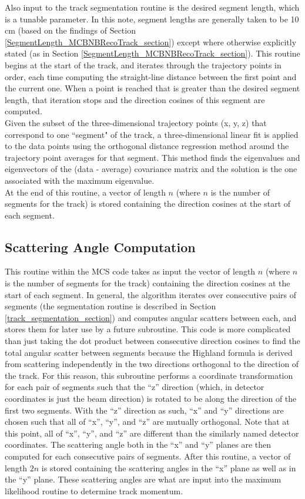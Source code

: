 Also input to the track segmentation routine is the desired segment length, which is a tunable parameter. In this note, segment lengths are generally taken to be 10 cm (based on the findings of Section \ref{SegmentLength_MCBNBRecoTrack_section}) except where otherwise explicitly stated (as in Section \ref{SegmentLength_MCBNBRecoTrack_section}). This routine begins at the start of the track, and iterates through the trajectory points in order, each time computing the straight-line distance between the first point and the current one. When a point is reached that is greater than the desired segment length, that iteration stops and the direction cosines of this segment are computed.\\

Given the subset of the three-dimensional trajectory points (x, y, z) that correspond to one ``segment" of the track, a three-dimensional linear fit is applied to the data points using the orthogonal distance regression method around the trajectory point averages for that segment. This method finds the eigenvalues and eigenvectors of the (data - average) covariance matrix and the solution is the one associated with the maximum eigenvalue.\\

At the end of this routine, a vector of length $n$ (where $n$ is the number of segments for the track) is stored containing the direction cosines at the start of each segment.


\subsection{Scattering Angle Computation}\label{scattering_angle_computation_section}
This routine within the MCS code takes as input the vector of length $n$ (where $n$ is the number of segments for the track) containing the direction cosines at the start of each segment. In general, the algorithm iterates over consecutive pairs of segments (the segmentation routine is described in Section \ref{track_segmentation_section}) and computes angular scatters between each, and stores them for later use by a future subroutine. This code is more complicated than just taking the dot product between consecutive direction cosines to find the total angular scatter between segments because the Highland formula is derived from scattering independently in the two directions orthogonal to the direction of the track. For this reason, this subroutine performs a coordinate transformation for each pair of segments such that the ``z'' direction (which, in detector coordinates is just the beam direction) is rotated to be along the direction of the first two segments. With the ``z'' direction as such, ``x'' and ``y'' directions are chosen such that all of ``x'', ``y'', and ``z'' are mutually orthogonal. Note that at this point, all of ``x'', ``y'', and ``z'' are different than the similarly named detector coordinates. The scattering angle both in the ``x'' and ``y'' planes are then computed for each consecutive pairs of segments. After this routine, a vector of length $2n$ is stored containing the scattering angles in the ``x'' plane as well as in the ``y'' plane. These scattering angles are what are input into the maximum likelihood routine to determine track momentum.


